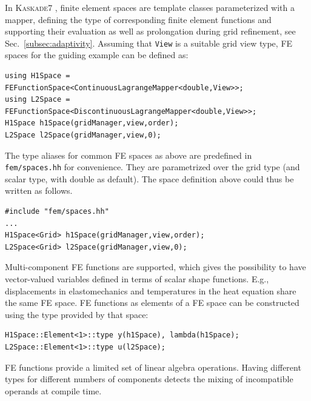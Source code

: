 \documentclass[11pt]{article}
\newcommand{\K}{\textsc{Kaskade7 }}
\begin{document}
In \K, finite element spaces are template classes parameterized with a mapper, defining the type of corresponding finite element functions and supporting their evaluation as well as prolongation during grid refinement, see Sec.~\ref{subsec:adaptivity}. Assuming that {\tt View} is a suitable \dune grid view type, FE spaces for the guiding example can be defined as:

\begin{lstlisting}
using H1Space = FEFunctionSpace<ContinuousLagrangeMapper<double,View>>;
using L2Space = FEFunctionSpace<DiscontinuousLagrangeMapper<double,View>>;
H1Space h1Space(gridManager,view,order);
L2Space l2Space(gridManager,view,0);
\end{lstlisting}
The type aliases for common FE spaces as above are predefined in \texttt{fem/spaces.hh} for convenience. They are parametrized over the grid type (and scalar type, with double as default). The space definition above could thus be written as follows.
\begin{lstlisting}
#include "fem/spaces.hh"
...
H1Space<Grid> h1Space(gridManager,view,order);
L2Space<Grid> l2Space(gridManager,view,0);
\end{lstlisting}


Multi-component FE functions are supported, which gives the possibility to have vector-valued variables defined in terms of 
scalar shape functions. E.g., displacements in elastomechanics and temperatures in the heat equation share the same FE space. 
FE functions as elements of a FE space can be constructed using the type provided by that space:

\begin{lstlisting}
H1Space::Element<1>::type y(h1Space), lambda(h1Space);
L2Space::Element<1>::type u(l2Space);
\end{lstlisting}

\noindent FE functions provide a limited set of linear algebra operations. Having different types for different numbers of components detects the mixing of incompatible operands at compile time.
\end{document}
